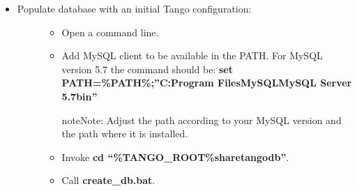\documentclass[letterpaper,10pt,english]{sphinxmanual}
\begin{document}
\begin{itemize}
\begin{description}
\begin{itemize}
\item {} 
Invoke command: \textbf{\%TANGO\_ROOT\%bindbconfig.exe}.
\begin{quote}

\begin{notice}{note}{Note:}
This lets you setup two environment variables
 and  used to access the MySQL server. You may use  credentials
provided upon MySQL installation if it is your development workstation. For production environment it is
suggested to create an additional user with  privileges. On Windows you may use \textbf{MySQL Installer}
from \emph{Start} menu and select the option \emph{Reconfigure} for MySQL Server.
Please refer to: \href{http://dev.mysql.com/doc/refman/5.7/en/adding-users.html}{http://dev.mysql.com/doc/refman/5.7/en/adding-users.html}
\end{notice}
\end{quote}

\end{itemize}

\end{description}

\item {} \begin{description}
\item[{Populate database with an initial Tango configuration:}] \leavevmode\begin{itemize}
\item {} 
Open a command line.

\item {} 
Add MySQL client to be available in the PATH. For MySQL version 5.7 the command should be:
\textbf{set PATH=\%PATH\%;''C:Program FilesMySQLMySQL Server 5.7bin''}

\begin{notice}{note}{Note:}
Adjust the path according to your MySQL version and the path where it is installed.
\end{notice}

\item {} 
Invoke \textbf{cd ``\%TANGO\_ROOT\%sharetangodb''}.

\item {} 
Call \textbf{create\_db.bat}.

\end{itemize}

\end{description}


\end{itemize}
\end{document}
